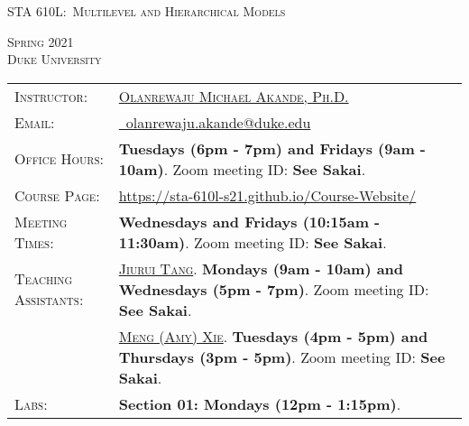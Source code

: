\documentclass[11pt, a4paper]{article}
\begin{document}
\renewcommand{\arraystretch}{1.5}	


\begin{center}
{\Large \textsc{STA 610L:\ Multilevel and Hierarchical Models}}
\end{center}


\begin{center}
	\textsc{Spring 2021} \\
	\textsc{Duke University} \\
\end{center}



\begin{center}
	\begin{minipage}[t]{.95\textwidth}
		\begin{tabular}{@{}L{3cm}L{12.5cm}}
			\toprule[0.065cm]
			\textsc{Instructor:} & \href{https://akandelanre.github.io.}{\textsc{Olanrewaju Michael Akande, Ph.D.}} \\
			\textsc{Email:} &\href{mailto:olanrewaju.akande@duke.edu}{\Envelope ~olanrewaju.akande@duke.edu} \\
			\textsc{Office Hours:} & \textbf{Tuesdays (6pm - 7pm) and Fridays (9am - 10am)}. \newline Zoom meeting ID: \textbf{See Sakai}. \\
			\textsc{Course Page:} & \href{https://sta-610l-s21.github.io/Course-Website/}{https://sta-610l-s21.github.io/Course-Website/} \\
			\textsc{Meeting Times:}  & \textbf{Wednesdays and Fridays (10:15am - 11:30am)}. \newline Zoom meeting ID: \textbf{See Sakai}. \\
			\textsc{Teaching Assistants:} & \href{https://scholars.duke.edu/person/jiurui.tang}{\textsc{Jiurui Tang}}. 
			\newline \textbf{Mondays (9am - 10am) and Wednesdays (5pm - 7pm)}. \newline Zoom meeting ID: \textbf{See Sakai}.  \\
			&\href{https://scholars.duke.edu/person/meng.xie}{\textsc{Meng (Amy) Xie}}. 
			\newline \textbf{Tuesdays (4pm - 5pm) and Thursdays (3pm - 5pm)}. \newline Zoom meeting ID: \textbf{See Sakai}. \\
			\textsc{Labs:} & \textbf{Section 01: Mondays (12pm - 1:15pm)}. 

\end{tabular}
\end{minipage}
\end{center}
\end{document}
